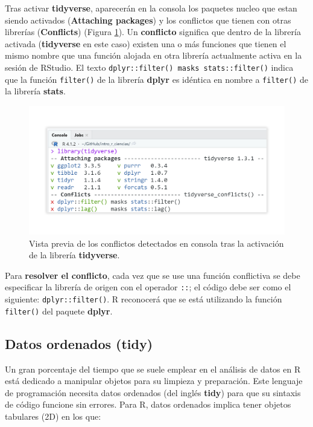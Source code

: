 \documentclass[
]{article}
\theoremstyle{definition}
\theoremstyle{definition}
\theoremstyle{definition}
\theoremstyle{definition}
\theoremstyle{remark}
\begin{document}
Tras activar \textbf{tidyverse}, aparecerán en la consola los paquetes nucleo que estan siendo activados (\textbf{Attaching packages}) y los conflictos que tienen con otras librerías (\textbf{Conflicts}) (Figura \ref{fig:conflictotidyverse}). Un \textbf{conflicto} significa que dentro de la librería activada (\textbf{tidyverse} en este caso) existen una o más funciones que tienen el mismo nombre que una función alojada en otra librería actualmente activa en la sesión de RStudio. El texto \texttt{dplyr::filter()\ masks\ stats::filter()} indica que la función \texttt{filter()} de la librería \textbf{dplyr} es idéntica en nombre a \texttt{filter()} de la librería \textbf{stats}.



\begin{figure}

{\centering \includegraphics[width=1\linewidth]{figs/screenshots/conflictos tidyverse} 

}

\caption{Vista previa de los conflictos detectados en consola tras la activación de la librería \textbf{tidyverse}.}\label{fig:conflictotidyverse}
\end{figure}

Para \textbf{resolver el conflicto}, cada vez que se use una función conflictiva se debe especificar la librería de origen con el operador \texttt{::}; el código debe ser como el siguiente: \texttt{dplyr::filter()}. R reconocerá que se está utilizando la función \texttt{filter()} del paquete \textbf{dplyr}.

\hypertarget{datosordenados}{%
\subsection{Datos ordenados (tidy)}\label{datosordenados}}

Un gran porcentaje del tiempo que se suele emplear en el análisis de datos en R está dedicado a manipular objetos para su limpieza y preparación. Este lenguaje de programación necesita datos ordenados (del inglés \textbf{tidy}) para que su sintaxis de código funcione sin errores. Para R, datos ordenados implica tener objetos tabulares (2D) en los que:
\end{document}
